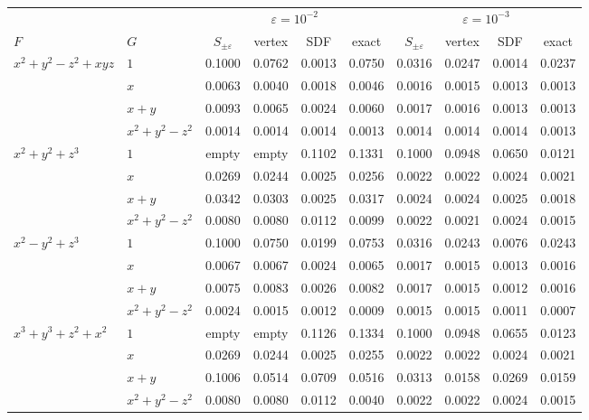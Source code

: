 \documentclass[12pt, a4paper]{article}
\theoremstyle{plain}
\theoremstyle{definition}
\theoremstyle{remark}
\theoremstyle{definition}
\begin{document}
\begin{table}[!ht]
\centering
\footnotesize
\setlength{\tabcolsep}{4pt}
\begin{adjustbox}{max width=\textwidth}
\begin{tabular}{l l c c c c c c c c}
\toprule
& & \multicolumn{4}{c}{$\varepsilon=10^{-2}$} & \multicolumn{4}{c}{$\varepsilon=10^{-3}$} \\
\cmidrule(lr){3-6}\cmidrule(lr){7-10}
$F$ & $G$ & $S_{\pm\varepsilon}$ & vertex & SDF & exact & $S_{\pm\varepsilon}$ & vertex & SDF & exact \\
\midrule
$x^2+y^2-z^2+xyz$ & $1$ & 0.1000 & 0.0762 & 0.0013 & 0.0750 & 0.0316 & 0.0247 & 0.0014 & 0.0237 \\
 & $x$ & 0.0063 & 0.0040 & 0.0018 & 0.0046 & 0.0016 & 0.0015 & 0.0013 & 0.0013 \\
 & $x+y$ & 0.0093 & 0.0065 & 0.0024 & 0.0060 & 0.0017 & 0.0016 & 0.0013 & 0.0013 \\
 & $x^2+y^2-z^2$ & 0.0014 & 0.0014 & 0.0014 & 0.0013 & 0.0014 & 0.0014 & 0.0014 & 0.0013 \\
\midrule
$x^2+y^2+z^3$ & $1$ & empty & empty & 0.1102 & 0.1331 & 0.1000 & 0.0948 & 0.0650 & 0.0121 \\
 & $x$ & 0.0269 & 0.0244 & 0.0025 & 0.0256 & 0.0022 & 0.0022 & 0.0024 & 0.0021 \\
 & $x+y$ & 0.0342 & 0.0303 & 0.0025 & 0.0317 & 0.0024 & 0.0024 & 0.0025 & 0.0018 \\
 & $x^2+y^2-z^2$ & 0.0080 & 0.0080 & 0.0112 & 0.0099 & 0.0022 & 0.0021 & 0.0024 & 0.0015 \\
\midrule
$x^2-y^2+z^3$ & $1$ & 0.1000 & 0.0750 & 0.0199 & 0.0753 & 0.0316 & 0.0243 & 0.0076 & 0.0243 \\
 & $x$ & 0.0067 & 0.0067 & 0.0024 & 0.0065 & 0.0017 & 0.0015 & 0.0013 & 0.0016 \\
 & $x+y$ & 0.0075 & 0.0083 & 0.0026 & 0.0082 & 0.0017 & 0.0015 & 0.0012 & 0.0016 \\
 & $x^2+y^2-z^2$ & 0.0024 & 0.0015 & 0.0012 & 0.0009 & 0.0015 & 0.0015 & 0.0011 & 0.0007 \\
\midrule
$x^3+y^3+z^2+x^2$ & $1$ & empty & empty & 0.1126 & 0.1334 & 0.1000 & 0.0948 & 0.0655 & 0.0123 \\
 & $x$ & 0.0269 & 0.0244 & 0.0025 & 0.0255 & 0.0022 & 0.0022 & 0.0024 & 0.0021 \\
 & $x+y$ & 0.1006 & 0.0514 & 0.0709 & 0.0516 & 0.0313 & 0.0158 & 0.0269 & 0.0159 \\
 & $x^2+y^2-z^2$ & 0.0080 & 0.0080 & 0.0112 & 0.0040 & 0.0022 & 0.0022 & 0.0024 & 0.0015 \\

\end{tabular}
\end{adjustbox}
\end{table}
\end{document}
